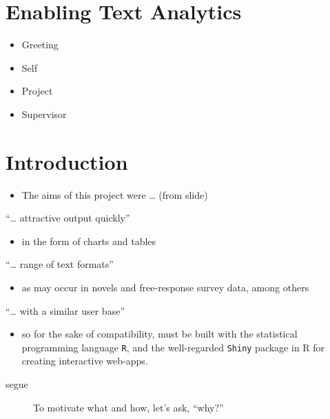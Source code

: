\documentclass[11pt,a4paper]{article}
\begin{document}
\section{Enabling Text Analytics}
\label{sec:enabl-text-analyt}
\begin{itemize}
\item Greeting
\item Self
\item Project
\item Supervisor
\end{itemize}

\section{Introduction}
\label{sec:introduction}
\begin{itemize}
\item The aims of this project were \dots{} (from slide)
\end{itemize}
\enquote{\dots{} attractive output quickly}
\begin{itemize}
\item in the form of charts and tables
\end{itemize}
\enquote{\dots{} range of text formats}
\begin{itemize}
\item as may occur in novels and free-response survey data, among
  others
\end{itemize}
\enquote{\dots{} with a similar user base}
\begin{itemize}
\item so for the sake of compatibility, must be built with the
  statistical programming language \texttt{R}, and the well-regarded
  \texttt{Shiny} package in R for creating interactive web-apps.
\end{itemize}
\begin{description}
\item[segue] To motivate what and how, let's ask, ``why?''
\end{description}
\end{document}
